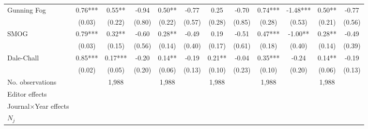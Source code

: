 \begin{sidewaystable}
\begin{threeparttable}
\begin{tabular}{p{3cm}S@{}S@{}S@{}S@{}S@{}S@{}S@{}S@{}S@{}S@{}S@{}}
            Gunning Fog                   &        0.76***&        0.55** &       -0.94   &        0.50** &       -0.77   &        0.25   &       -0.70   &        0.74***&       -1.48***&        0.50** &       -0.77   \\
                                          &      (0.03)   &      (0.22)   &      (0.80)   &      (0.22)   &      (0.57)   &      (0.28)   &      (0.85)   &      (0.28)   &      (0.53)   &      (0.21)   &      (0.56)   \\
            SMOG                          &        0.79***&        0.32** &       -0.60   &        0.28** &       -0.49   &        0.19   &       -0.51   &        0.47***&       -1.00** &        0.28** &       -0.49   \\
                                          &      (0.03)   &      (0.15)   &      (0.56)   &      (0.14)   &      (0.40)   &      (0.17)   &      (0.61)   &      (0.18)   &      (0.40)   &      (0.14)   &      (0.39)   \\
            Dale-Chall                    &        0.85***&        0.17***&       -0.20   &        0.14** &       -0.19   &        0.21** &       -0.04   &        0.35***&       -0.24   &        0.14** &       -0.19   \\
                                          &      (0.02)   &      (0.05)   &      (0.20)   &      (0.06)   &      (0.13)   &      (0.10)   &      (0.23)   &      (0.10)   &      (0.20)   &      (0.06)   &      (0.13)   \\
            \midrule
            No. observations              &               &       1,988   &               &       1,988   &               &       1,988   &               &       1,988   &               &       1,988   &               \\
            \midrule
            Editor effects       &               &           {}   &               &           {}   &               &           {}   &               &           {}   &               &               &               \\
            Journal\(\times\)Year effects          &               &           {}   &               &           {}   &               &           {}   &               &           {}   &               &               &               \\
            \(N_j\)                       &               &           {}   &               &           {}   &               &           {}   &               &           {}   &               &               &               \\

\end{tabular}
\end{threeparttable}
\end{sidewaystable}
